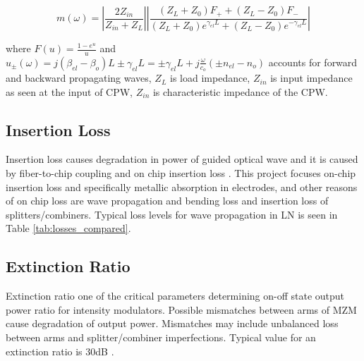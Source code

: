 \documentclass[thesis]{deutez}
\begin{document}
    \begin{equation}
        m(\omega) = \left| \frac{2Z_{in}}{Z_{in} + Z_L} \right| 
        \left| \frac{(Z_L + Z_0)F_{+} + (Z_L - Z_0)F_{-}}{(Z_L + Z_0)e^{\gamma_{el} L} + (Z_L - Z_0)e^{-\gamma_{el} L}} \right|
        \label{eq:eo-response}
    \end{equation}

    where $F(u)=\frac{1-e^u}{u}$ and $u_{\pm}(\omega) = j(\beta_{el}-\beta_o)L \pm \gamma_{el}L = \pm \gamma_{el}L + j\frac{\omega}{c_o}(\pm n_{el}-n_o) $ accounts for forward and backward propagating waves, $Z_L$ is load impedance, $Z_{in}$ is input impedance as seen at the input of CPW, $Z_{in}$ is characteristic impedance of the CPW.



\subsection{Insertion Loss}

    Insertion loss causes degradation in power of guided optical wave and it is caused by fiber-to-chip coupling and on chip insertion loss \cite{1}. This project focuses  on-chip insertion loss and specifically metallic absorption in electrodes, and other reasons of on chip loss are wave propagation and bending loss and insertion loss of splitters/combiners. Typical loss levels for wave propagation in LN is seen in Table \ref{tab:losses_compared}.
    
    \subsection{Extinction Ratio}

    Extinction ratio one of the critical parameters determining on-off state output power ratio for intensity modulators. Possible mismatches between arms of MZM cause degradation of output power. Mismatches may include unbalanced loss between arms and splitter/combiner imperfections. Typical value for an extinction ratio is 30dB \cite{14}.
\end{document}
